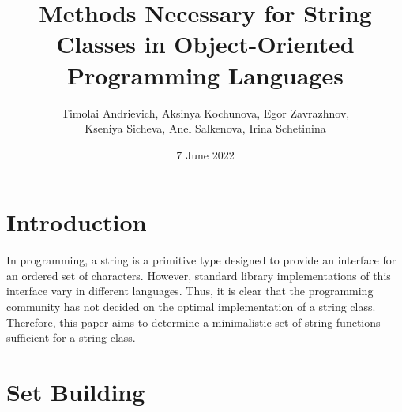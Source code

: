 \documentclass[11pt,nonacm,natbib=false]{acmart}
\title{Methods Necessary for String Classes in Object-Oriented Programming Languages}
\author{
Timolai Andrievich, 
 Aksinya Kochunova, 
 Egor Zavrazhnov, \\
 Kseniya Sicheva, 
 Anel Salkenova, 
 Irina Schetinina 
}
\date{7 June 2022}
\affil{Innopolis University}
\begin{document}
\maketitle

\section{Introduction}
In programming, a string is a primitive type designed to provide an interface for an ordered set of characters. However, standard library implementations of this interface vary in different languages. Thus, it is clear that the programming community has not decided on the optimal implementation of a string class. Therefore, this paper aims to determine a minimalistic set of string functions sufficient for a string class.

\section{Set Building}
\end{document}
